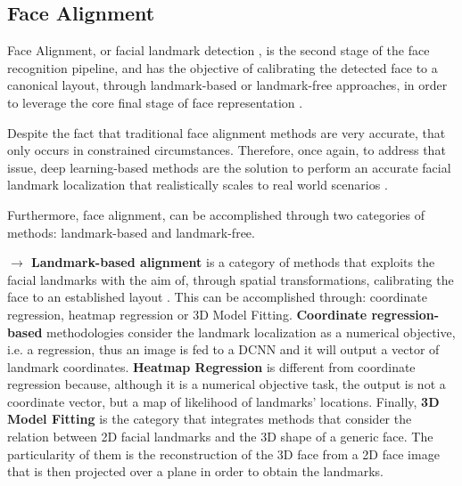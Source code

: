 \documentclass[class=report, crop=false, a4paper, 12pt]{standalone}
\begin{document}
\subsection{Face Alignment}
\par Face Alignment, or facial landmark detection \autocite{changFacePoseNetMakingCase2017}, is the second stage of the face recognition pipeline, and has the objective of calibrating the detected face to a canonical layout, through landmark-based or landmark-free approaches, in order to leverage the core final stage of face representation \autocite{duElementsEndtoendDeep2022}. 
\par Despite the fact that traditional face alignment methods are very accurate, that only occurs in constrained circumstances. Therefore, once again, to address that issue, deep learning-based methods are the solution to perform an accurate facial landmark localization that realistically scales to real world scenarios \autocite{fengWingLossRobust2018}. 
\par Furthermore, face alignment, can be accomplished through two categories of methods: landmark-based and landmark-free.

\vspace{0.7\baselineskip}
\noindent\textbf{$\rightarrow$ Landmark-based alignment} is a category of methods that exploits the facial landmarks with the aim of, through spatial transformations, calibrating the face to an established layout \autocite{duElementsEndtoendDeep2022}. This can be accomplished through: coordinate regression, heatmap regression or 3D Model Fitting. \textbf{Coordinate regression-based} methodologies \autocite{fengWingLossRobust2018,liuTwoStreamTransformerNetworks2018,zhangJointFaceDetection2016a} consider the landmark localization as a numerical objective, i.e. a regression, thus an image is fed to a DCNN and it will output a vector of landmark coordinates. \textbf{Heatmap Regression} \autocite{dengJointMultiviewFace2017,wuLookBoundaryBoundaryAware2018,chenFaceAlignmentKernel2019} is different from coordinate regression because, although it is a numerical objective task, the output is not a coordinate vector, but a map of likelihood of landmarks' locations. Finally, \textbf{3D Model Fitting} \autocite{bhagavatulaFasterRealtimeFacial2017,changFacePoseNetMakingCase2017,xiaoRecurrent3D2DDual2017}is the category that integrates methods that consider the relation between 2D facial landmarks and the 3D shape of a generic face. The particularity of them is the reconstruction of the 3D face from a 2D face image that is then projected over a plane in order to obtain the landmarks. 
\end{document}
